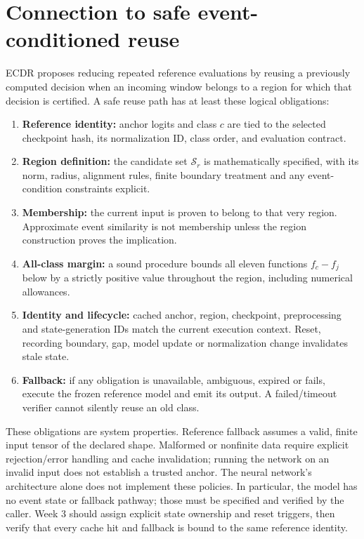 \documentclass[11pt,a4paper]{article}
\begin{document}
\section{Connection to safe event-conditioned reuse}
ECDR proposes reducing repeated reference evaluations by reusing a previously computed decision when an incoming window belongs to a region for which that decision is certified. A safe reuse path has at least these logical obligations:
\begin{enumerate}
\item \textbf{Reference identity:} anchor logits and class $c$ are tied to the selected checkpoint hash, its normalization ID, class order, and evaluation contract.
\item \textbf{Region definition:} the candidate set $\mathcal S_r$ is mathematically specified, with its norm, radius, alignment rules, finite boundary treatment and any event-condition constraints explicit.
\item \textbf{Membership:} the current input is proven to belong to that very region. Approximate event similarity is not membership unless the region construction proves the implication.
\item \textbf{All-class margin:} a sound procedure bounds all eleven functions $f_c-f_j$ below by a strictly positive value throughout the region, including numerical allowances.
\item \textbf{Identity and lifecycle:} cached anchor, region, checkpoint, preprocessing and state-generation IDs match the current execution context. Reset, recording boundary, gap, model update or normalization change invalidates stale state.
\item \textbf{Fallback:} if any obligation is unavailable, ambiguous, expired or fails, execute the frozen reference model and emit its output. A failed/timeout verifier cannot silently reuse an old class.
\end{enumerate}
These obligations are system properties. Reference fallback assumes a valid, finite input tensor of the declared shape. Malformed or nonfinite data require explicit rejection/error handling and cache invalidation; running the network on an invalid input does not establish a trusted anchor. The neural network's architecture alone does not implement these policies. In particular, the model has no event state or fallback pathway; those must be specified and verified by the caller. Week 3 should assign explicit state ownership and reset triggers, then verify that every cache hit and fallback is bound to the same reference identity.
\end{document}
